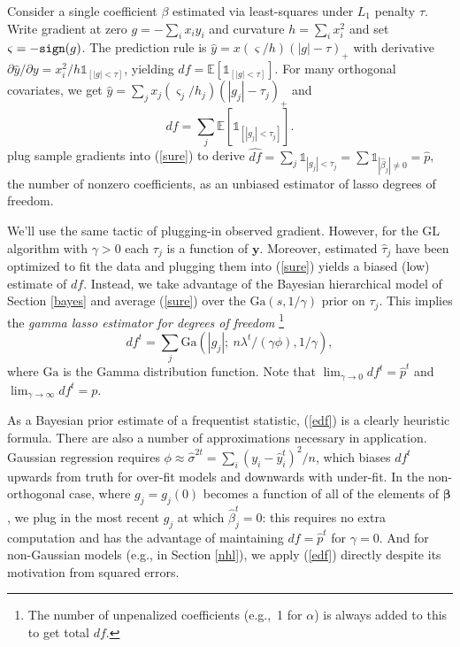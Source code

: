 \documentclass[12pt]{article}
\newcommand{\bs}[1]{\boldsymbol{#1}}
\newcommand{\mr}[1]{\mathrm{#1}}
\newcommand{\bm}[1]{\mathbf{#1}}
\newcommand{\ds}[1]{\mathds{#1}}
\begin{document}
Consider  a single coefficient $\beta$ estimated via least-squares
under $L_1$ penalty $\tau$.   Write gradient at zero $g = -\sum_i
x_iy_i$ and curvature $h = \sum_i x_i^2$ and set $\varsigma = -{\tt sign}(g)$.
The prediction rule is $\hat y =
x(\varsigma/h)(|g|-\tau)_+$ with  derivative $\partial \hat y/\partial y =
x_i^2/h \ds{1}_{[|g|<\tau]}$, yielding 
$df = \ds{E}\left[ \ds{1}_{[|g|<\tau]} \right]$.   For many orthogonal
covariates, we get $\hat y = \sum_j x_j(\varsigma_j/h_j)(|g_j|-\tau_j)_+$ and
\begin{equation} \label{sure} df = \sum_j
\ds{E}\left[ \ds{1}_{[|g_j|<\tau_j]} \right].
\end{equation}
\cite{zou_degrees_2007} plug sample gradients into (\ref{sure}) to derive
$\hat{df} = \sum_j \ds{1}_{|g_j| < \tau_j} = \sum \ds{1}_{|\hat\beta_j| \neq 0} = \hat p$, the number of
nonzero  coefficients, as an unbiased estimator of lasso
degrees of freedom.


We'll use the same tactic of plugging-in observed gradient.  However, for the
GL algorithm with $\gamma>0$ each $\tau_j$ is a function of $\bm{y}$.
Moreover, estimated $\hat\tau_j$ have been optimized to fit the data and
plugging them into (\ref{sure}) yields a biased (low) estimate of $df$.
Instead, we take advantage of the Bayesian  hierarchical model of Section
\ref{bayes} and average (\ref{sure}) over the $\mr{Ga}(s,1/\gamma)$ prior on
$\tau_j$. This implies the {\it gamma lasso estimator for degrees of freedom}
\footnote{The number of unpenalized coefficients (e.g.,~1 for
$\alpha$) is always added to this to get total $df$.} 
\begin{equation}
\label{edf} df^t = \sum_j \mr{Ga}(|g_{j}|;~ n\lambda^t/(\gamma\phi),
1/\gamma), \end{equation} where $\mr{Ga}$ is the Gamma distribution
function. Note that $\lim_{\gamma \to 0} df^t = \hat
p^t$ and  $\lim_{\gamma \to \infty} df^t= p$.

As a Bayesian prior estimate of a frequentist statistic, (\ref{edf}) is a
clearly heuristic formula.  There are also a number of approximations
necessary in application.  Gaussian regression requires $\phi
\approx \hat\sigma^{2t} = \sum_i (y_i - \hat y^t_i)^2/n$, which biases
 $df^t$ upwards from truth for over-fit models and downwards with
under-fit.   In the non-orthogonal case, where $g_{j} = g_j(0)$ becomes a
function of all of the elements of $\bs{\beta}$, we plug in the most recent
$g_j$ at which $\hat\beta^t_j=0$:  this
requires no extra computation and has the advantage of maintaining $df =
\hat p^t$ for $\gamma = 0$.  And for non-Gaussian models (e.g.,
in Section \ref{nhl}), we apply (\ref{edf}) directly despite its
motivation from squared errors.
\end{document}
